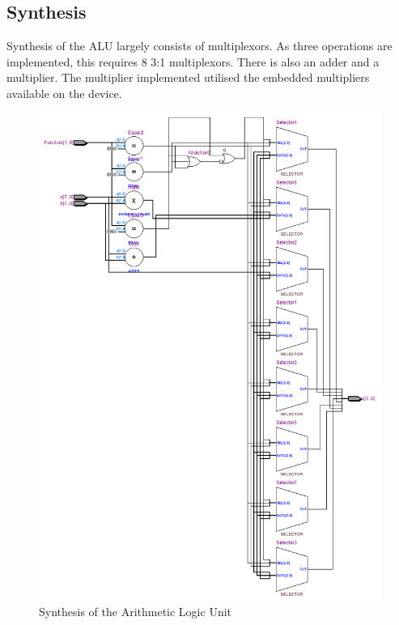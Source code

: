 \subsection{Synthesis}

Synthesis of the ALU largely consists of multiplexors. 
As three operations are implemented, this requires 8 3:1 multiplexors. 
There is also an adder and a multiplier. 
The multiplier implemented utilised the embedded multipliers available on the device.

\begin{figure}
\includegraphics[height=\textheight]{Figures/alusynth.png}
\caption{Synthesis of the Arithmetic Logic Unit}
\label{fig:alusynth}
\end{figure}
